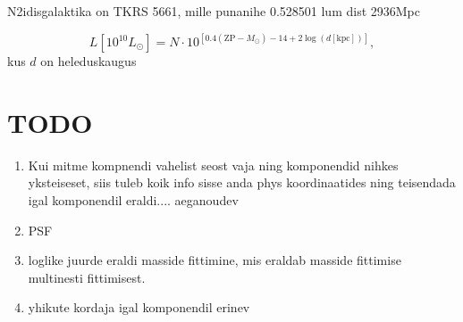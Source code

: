 \documentclass{article}
\begin{document}
	N2idisgalaktika on TKRS 5661, mille punanihe 0.528501 lum dist 2936Mpc
	
	\begin{equation}
		L\left[ 10^{10}L_\odot \right] = N\cdot10^{\left[ 0.4(\mathrm{ZP}-M_\odot) -14 + 2\log(d[\mathrm{kpc}]) \right]},
	\end{equation}
	kus $d$ on heleduskaugus
	
	
	\section{TODO} %
	\label{sec:todo}
	\begin{enumerate}
		\item Kui mitme kompnendi vahelist seost vaja ning komponendid nihkes yksteiseset, siis tuleb koik info sisse anda phys koordinaatides ning teisendada igal komponendil eraldi.... aeganoudev
		\item PSF
		\item loglike juurde eraldi masside fittimine, mis eraldab masside fittimise multinesti fittimisest.
		\item yhikute kordaja igal komponendil erinev
	\end{enumerate}
\end{document}
